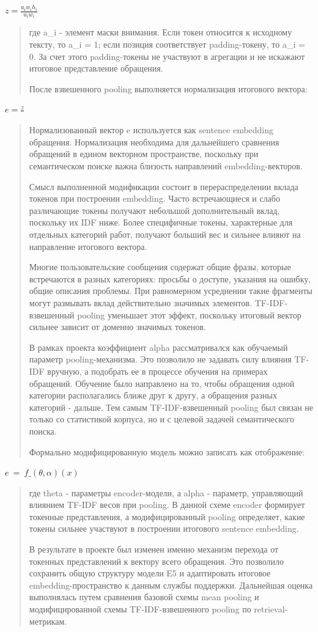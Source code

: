 \(z = \frac{a_{i}w_{i}h_{i}}{a_{i}w_{i}}\)

\begin{quote}
где a\_i - элемент маски внимания. Если токен относится к исходному
тексту, то a\_i = 1; если позиция соответствует padding-токену, то a\_i
= 0. За счет этого padding-токены не участвуют в агрегации и не искажают
итоговое представление обращения.

После взвешенного pooling выполняется нормализация итогового вектора:
\end{quote}

\(e = \frac{z}{}\)

\begin{quote}
Нормализованный вектор e используется как sentence embedding обращения.
Нормализация необходима для дальнейшего сравнения обращений в едином
векторном пространстве, поскольку при семантическом поиске важна
близость направлений embedding-векторов.

Смысл выполненной модификации состоит в перераспределении вклада токенов
при построении embedding. Часто встречающиеся и слабо различающие токены
получают небольшой дополнительный вклад, поскольку их IDF ниже. Более
специфичные токены, характерные для отдельных категорий работ, получают
больший вес и сильнее влияют на направление итогового вектора.

Многие пользовательские сообщения содержат общие фразы, которые
встречаются в разных категориях: просьбы о доступе, указания на ошибку,
общие описания проблемы. При равномерном усреднении такие фрагменты
могут размывать вклад действительно значимых элементов.
TF-IDF-взвешенный pooling уменьшает этот эффект, поскольку итоговый
вектор сильнее зависит от доменно значимых токенов.

В рамках проекта коэффициент alpha рассматривался как обучаемый параметр
pooling-механизма. Это позволило не задавать силу влияния TF-IDF
вручную, а подобрать ее в процессе обучения на примерах обращений.
Обучение было направлено на то, чтобы обращения одной категории
располагались ближе друг к другу, а обращения разных категорий - дальше.
Тем самым TF-IDF-взвешенный pooling был связан не только со статистикой
корпуса, но и с целевой задачей семантического поиска.

Формально модифицированную модель можно записать как отображение:
\end{quote}

\(e\  = \ f\_(\theta,\alpha)(x)\)

\begin{quote}
где theta - параметры encoder-модели, а alpha - параметр, управляющий
влиянием TF-IDF весов при pooling. В данной схеме encoder формирует
токенные представления, а модифицированный pooling определяет, какие
токены сильнее участвуют в построении итогового sentence embedding.

В результате в проекте был изменен именно механизм перехода от токенных
представлений к вектору всего обращения. Это позволило сохранить общую
структуру модели E5 и адаптировать итоговое embedding-пространство к
данным службы поддержки. Дальнейшая оценка выполнялась путем сравнения
базовой схемы mean pooling и модифицированной схемы TF-IDF-взвешенного
pooling по retrieval-метрикам.
\end{quote}

